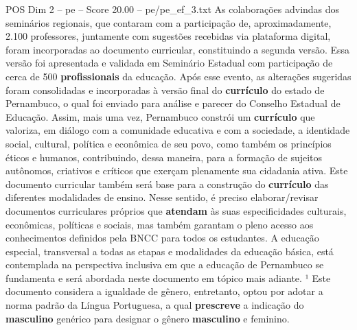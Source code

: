 \begin{textsample}{POS Dim 2 – pe – Score 20.00 – pe/pe\_ef\_3.txt}
As colaborações advindas dos seminários regionais, que contaram com a participação de, aproximadamente, 2.100 professores, juntamente com sugestões recebidas via plataforma digital, foram incorporadas ao documento curricular, constituindo a segunda versão.
Essa versão foi apresentada e validada em Seminário Estadual com participação de cerca de 500 \textbf{profissionais} da educação.
Após esse evento, as alterações sugeridas foram consolidadas e incorporadas à versão final do \textbf{currículo} do estado de Pernambuco, o qual foi enviado para análise e parecer do Conselho Estadual de Educação.
Assim, mais uma vez, Pernambuco constrói um \textbf{currículo} que valoriza, em diálogo com a comunidade educativa e com a sociedade, a identidade social, cultural, política e econômica de seu povo, como também os princípios éticos e humanos, contribuindo, dessa maneira, para a formação de sujeitos autônomos, criativos e críticos que exerçam plenamente sua cidadania ativa.
Este documento curricular também será base para a construção do \textbf{currículo} das diferentes modalidades de ensino.
Nesse sentido, é preciso elaborar/revisar documentos curriculares próprios que \textbf{atendam} às suas especificidades culturais, econômicas, políticas e sociais, mas também garantam o pleno acesso aos conhecimentos definidos pela BNCC para todos os estudantes.
A educação especial, transversal a todas as etapas e modalidades da educação básica, está contemplada na perspectiva inclusiva em que a educação de Pernambuco se fundamenta e será abordada neste documento em tópico mais adiante. ¹ Este documento considera a igualdade de gênero, entretanto, optou por adotar a norma padrão da Língua Portuguesa, a qual \textbf{prescreve} a indicação do \textbf{masculino} genérico para designar o gênero \textbf{masculino} e feminino.

\end{textsample}
